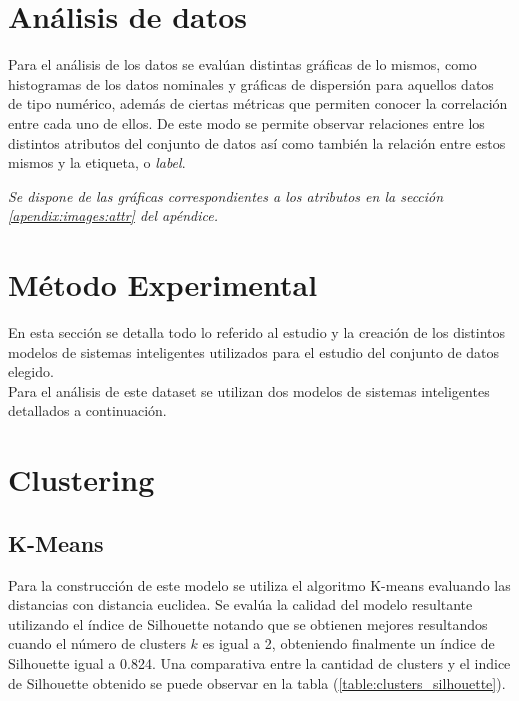 \documentclass[osajnl,twocolumn,showpacs,superscriptaddress,10pt]{revtex4-1} %
\begin{document}
\section{Análisis de datos}

Para el análisis de los datos se evalúan distintas gráficas de lo mismos, como histogramas de los datos nominales y gráficas de dispersión para aquellos datos de tipo numérico, además de ciertas métricas que permiten conocer la correlación entre cada uno de ellos. De este modo se permite observar relaciones entre los distintos atributos del conjunto de datos así como también la relación entre estos mismos y la etiqueta, o \textit{label}.

\begin{flushright}
\textit{\footnotesize Se dispone de las gráficas correspondientes a los atributos en la sección \ref{apendix:images:attr} del apéndice.}
\end{flushright}

\section{Método Experimental}

En esta sección se detalla todo lo referido al estudio y la creación de los distintos modelos de sistemas inteligentes utilizados para el estudio del conjunto de datos elegido. \\

Para el análisis de este dataset se utilizan dos modelos de sistemas inteligentes detallados a continuación.

\section{Clustering}

\subsection{K-Means}

Para la construcción de este modelo se utiliza el algoritmo K-means evaluando las distancias con distancia euclidea. Se evalúa la calidad del modelo resultante utilizando el índice de Silhouette notando que se obtienen mejores resultandos cuando el número de clusters $k$ es igual a 2, obteniendo finalmente un índice de Silhouette igual a 0.824. Una comparativa entre la cantidad de clusters y el indice de Silhouette obtenido se puede observar en la tabla (\ref{table:clusters_silhouette}). \\
\end{document}

